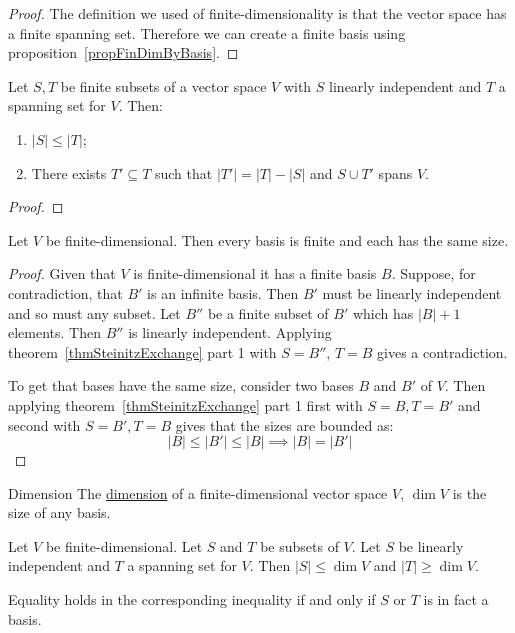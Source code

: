 \documentclass[../Main.tex]{subfiles}
\begin{document}
\begin{proof}
    The definition we used of finite-dimensionality is that the vector space has a finite spanning set. Therefore we can create a finite basis using proposition~\ref{propFinDimByBasis}.
\end{proof}
\begin{theorem}
    Let $S, T$ be finite subsets of a vector space $V$ with $S$ linearly independent and $T$ a spanning set for $V$. Then:
    \begin{enumerate}
        \item $|S| \leq |T|$;
        \item There exists $T' \subseteq T$ such that $|T'| = |T| - |S|$ and $S \cup T'$ spans $V$.
    \end{enumerate}
    \label{thmSteinitzExchange}
\end{theorem}
\begin{proof}
\end{proof}
\begin{corollary}
    Let $V$ be finite-dimensional. Then every basis is finite and each has the same size.
    \label{corBasesSameSize}
\end{corollary}
\begin{proof}
    Given that $V$ is finite-dimensional it has a finite basis $B$. Suppose, for contradiction, that $B'$ is an infinite basis. Then $B'$ must be linearly independent and so must any subset. Let $B''$ be a finite subset of $B'$ which has $|B| + 1$ elements. Then $B''$ is linearly independent. Applying theorem~\ref{thmSteinitzExchange} part 1 with $S = B''$, $T = B$ gives a contradiction.

    To get that bases have the same size, consider two bases $B$ and $B'$ of $V$. Then applying theorem~\ref{thmSteinitzExchange} part 1 first with $S = B, T = B'$ and second with $S = B', T = B$ gives that the sizes are bounded as:
    \begin{equation*}
        |B| \leq |B'| \leq |B| \implies |B| = |B'|
    \end{equation*}
\end{proof}
\begin{definition}{Dimension}
    The \underline{dimension} of a finite-dimensional vector space $V$, $\dim{V}$ is the size of any basis.
\end{definition}
\begin{corollary}
    Let $V$ be finite-dimensional. Let $S$ and $T$ be subsets of $V$. Let $S$ be linearly independent and $T$ a spanning set for $V$. Then $|S| \leq \dim{V}$ and $|T| \geq \dim{V}$.

    Equality holds in the corresponding inequality if and only if $S$ or $T$ is in fact a basis.
    \label{corSpanLISizes}
\end{corollary}
\end{document}

